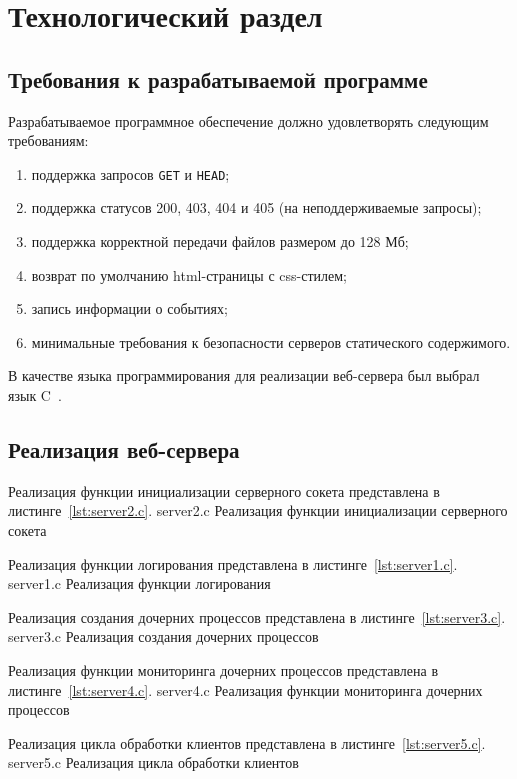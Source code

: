 \chapter{Технологический раздел}

\section{Требования к разрабатываемой программе}

Разрабатываемое программное обеспечение должно удовлетворять следующим требованиям:
\begin{enumerate}[leftmargin=1.6\parindent]
	\item поддержка запросов \texttt{GET} и \texttt{HEAD};
	\item поддержка статусов 200, 403, 404 и 405 (на неподдерживаемые запросы);
	\item поддержка корректной передачи файлов размером до 128 Мб;
	\item возврат по умолчанию html-страницы с css-стилем;
	\item запись информации о событиях;
	\item минимальные требования к безопасности серверов статического содержимого.
\end{enumerate}

В качестве языка программирования для реализации веб-сервера был выбрал язык C~\cite{c_language}.

\clearpage
\section{Реализация веб-сервера}

Реализация функции инициализации серверного сокета представлена в листинге~\ref{lst:server2.c}.
	{server2.c}
	{Реализация функции инициализации серверного сокета}
\clearpage

Реализация функции логирования представлена в листинге~\ref{lst:server1.c}.
	{server1.c}
	{Реализация функции логирования}


Реализация создания дочерних процессов представлена в листинге~\ref{lst:server3.c}.
	{server3.c}
	{Реализация создания дочерних процессов}
\clearpage

Реализация функции мониторинга дочерних процессов представлена в листинге~\ref{lst:server4.c}.
	{server4.c}
	{Реализация функции мониторинга дочерних процессов}
\clearpage

Реализация цикла обработки клиентов представлена в листинге~\ref{lst:server5.c}.
	{server5.c}
	{Реализация цикла обработки клиентов}
\clearpage

